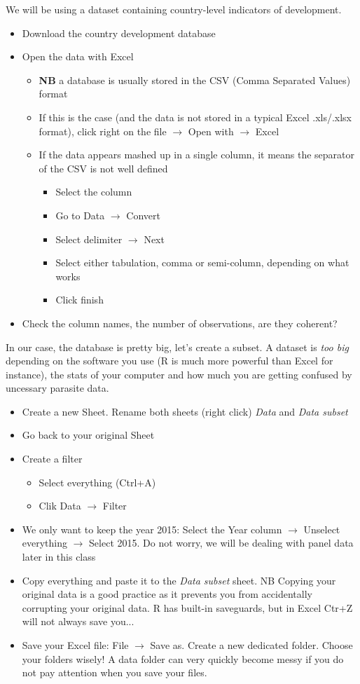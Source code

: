 \documentclass{article}
\begin{document}
    We will be using a dataset containing country-level indicators of development.
    \begin{itemize}
		\item Download the country development database
		\item Open the data with Excel
		\begin{itemize}
			\item \textbf{NB} a database is usually stored in the CSV (Comma Separated Values) format
			\item If this is the case (and the data is not stored in a typical Excel .xls/.xlsx format), click right on the file $\rightarrow$ Open with $\rightarrow$ Excel
			\item If the data appears mashed up in a single column, it means the separator of the CSV is not well defined
			\begin{itemize}
				\item Select the column
				\item Go to Data $\rightarrow$ Convert
				\item Select delimiter $\rightarrow$ Next
				\item Select either tabulation, comma or semi-column, depending on what works
				\item Click finish
			\end{itemize}
		\end{itemize}
		\item Check the column names, the number of observations, are they coherent?
	\end{itemize}
	In our case, the database is pretty big, let's create a subset. A dataset is \textit{too big} depending on the software you use (R is much more powerful than Excel for instance), the stats of your computer and how much you are getting confused by uncessary parasite data.
	\begin{itemize}
		\item Create a new Sheet. Rename both sheets (right click) \textit{Data} and \textit{Data subset}
		\item Go back to your original Sheet
		\item Create a filter
		\begin{itemize}
			\item Select everything (Ctrl+A)
			\item Clik Data $\rightarrow$ Filter
		\end{itemize}
		\item We only want to keep the year 2015: Select the Year column $\rightarrow$ Unselect everything $\rightarrow$ Select 2015. Do not worry, we will be dealing with panel data later in this class
		\item Copy everything and paste it to the \textit{Data subset} sheet. NB Copying your original data is a good practice as it prevents you from accidentally corrupting your original data. R has built-in saveguards, but in Excel Ctr+Z will not always save you...
		\item Save your Excel file: File $\rightarrow$ Save as. Create a new dedicated folder. Choose your folders wisely! A data folder can very quickly become messy if you do not pay attention when you save your files.
	\end{itemize}
\end{document}

